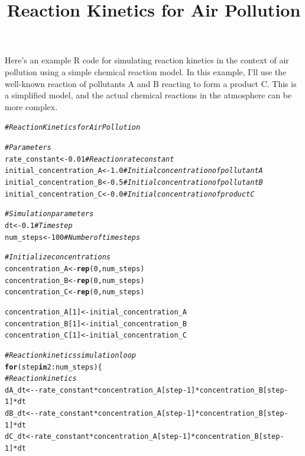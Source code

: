 \documentclass{tufte-handout}\usepackage[]{graphicx}\usepackage[]{xcolor}
\title{Reaction Kinetics for Air Pollution}
\makeatletter
\newcommand{\hlnum}[1]{\textcolor[rgb]{0.686,0.059,0.569}{#1}}%
\newcommand{\hlcom}[1]{\textcolor[rgb]{0.678,0.584,0.686}{\textit{#1}}}%
\newcommand{\hlopt}[1]{\textcolor[rgb]{0,0,0}{#1}}%
\newcommand{\hlstd}[1]{\textcolor[rgb]{0.345,0.345,0.345}{#1}}%
\newcommand{\hlkwa}[1]{\textcolor[rgb]{0.161,0.373,0.58}{\textbf{#1}}}%
\newcommand{\hlkwb}[1]{\textcolor[rgb]{0.69,0.353,0.396}{#1}}%
\newcommand{\hlkwd}[1]{\textcolor[rgb]{0.737,0.353,0.396}{\textbf{#1}}}%
\newenvironment{kframe}{%
 \def\at@end@of@kframe{}%
 \ifinner\ifhmode%
  \def\at@end@of@kframe{\end{minipage}}%
  \begin{minipage}{\columnwidth}%
 \fi\fi%
 \def\FrameCommand##1{\hskip\@totalleftmargin \hskip-\fboxsep
 \colorbox{shadecolor}{##1}\hskip-\fboxsep
     \hskip-\linewidth \hskip-\@totalleftmargin \hskip\columnwidth}%
 \MakeFramed {\advance\hsize-\width
   \@totalleftmargin\z@ \linewidth\hsize
   \@setminipage}}%
 {\par\unskip\endMakeFramed%
 \at@end@of@kframe}
\newenvironment{knitrout}{}{} %
\makeatother
\begin{document}
\maketitle


Here's an example R code for simulating reaction kinetics in the context of air pollution using a simple chemical reaction model. In this example, I'll use the well-known reaction of pollutants A and B reacting to form a product C. This is a simplified model, and the actual chemical reactions in the atmosphere can be more complex.

\begin{knitrout}
\color{fgcolor}\begin{kframe}
\begin{alltt}
\hlcom{# Reaction Kinetics for Air Pollution}

\hlcom{# Parameters}
\hlstd{rate_constant} \hlkwb{<-} \hlnum{0.01}   \hlcom{# Reaction rate constant}
\hlstd{initial_concentration_A} \hlkwb{<-} \hlnum{1.0}  \hlcom{# Initial concentration of pollutant A}
\hlstd{initial_concentration_B} \hlkwb{<-} \hlnum{0.5}  \hlcom{# Initial concentration of pollutant B}
\hlstd{initial_concentration_C} \hlkwb{<-} \hlnum{0.0}  \hlcom{# Initial concentration of product C}

\hlcom{# Simulation parameters}
\hlstd{dt} \hlkwb{<-} \hlnum{0.1}    \hlcom{# Time step}
\hlstd{num_steps} \hlkwb{<-} \hlnum{100}   \hlcom{# Number of time steps}

\hlcom{# Initialize concentrations}
\hlstd{concentration_A} \hlkwb{<-} \hlkwd{rep}\hlstd{(}\hlnum{0}\hlstd{, num_steps)}
\hlstd{concentration_B} \hlkwb{<-} \hlkwd{rep}\hlstd{(}\hlnum{0}\hlstd{, num_steps)}
\hlstd{concentration_C} \hlkwb{<-} \hlkwd{rep}\hlstd{(}\hlnum{0}\hlstd{, num_steps)}

\hlstd{concentration_A[}\hlnum{1}\hlstd{]} \hlkwb{<-} \hlstd{initial_concentration_A}
\hlstd{concentration_B[}\hlnum{1}\hlstd{]} \hlkwb{<-} \hlstd{initial_concentration_B}
\hlstd{concentration_C[}\hlnum{1}\hlstd{]} \hlkwb{<-} \hlstd{initial_concentration_C}

\hlcom{# Reaction kinetics simulation loop}
\hlkwa{for} \hlstd{(step} \hlkwa{in} \hlnum{2}\hlopt{:}\hlstd{num_steps) \{}
  \hlcom{# Reaction kinetics}
  \hlstd{dA_dt} \hlkwb{<-} \hlopt{-}\hlstd{rate_constant} \hlopt{*} \hlstd{concentration_A[step} \hlopt{-} \hlnum{1}\hlstd{]} \hlopt{*} \hlstd{concentration_B[step} \hlopt{-} \hlnum{1}\hlstd{]} \hlopt{*} \hlstd{dt}
  \hlstd{dB_dt} \hlkwb{<-} \hlopt{-}\hlstd{rate_constant} \hlopt{*} \hlstd{concentration_A[step} \hlopt{-} \hlnum{1}\hlstd{]} \hlopt{*} \hlstd{concentration_B[step} \hlopt{-} \hlnum{1}\hlstd{]} \hlopt{*} \hlstd{dt}
  \hlstd{dC_dt} \hlkwb{<-} \hlstd{rate_constant} \hlopt{*} \hlstd{concentration_A[step} \hlopt{-} \hlnum{1}\hlstd{]} \hlopt{*} \hlstd{concentration_B[step} \hlopt{-} \hlnum{1}\hlstd{]} \hlopt{*} \hlstd{dt}


\end{alltt}
\end{kframe}
\end{knitrout}
\end{document}
